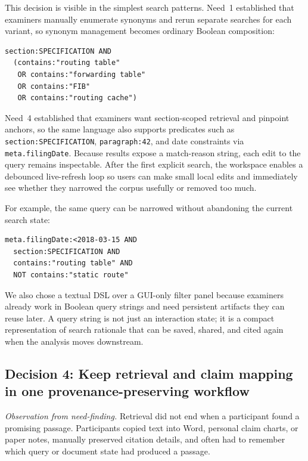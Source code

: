 \documentclass[sigconf]{acmart}
\begin{document}
This decision is visible in the simplest search patterns. Need~1 established
that examiners manually enumerate synonyms and rerun separate searches for each
variant, so synonym management becomes ordinary Boolean composition:

\begin{lstlisting}[caption={Synonym expansion across a loaded corpus.}]
section:SPECIFICATION AND
  (contains:"routing table"
   OR contains:"forwarding table"
   OR contains:"FIB"
   OR contains:"routing cache")
\end{lstlisting}

Need~4 established that examiners want section-scoped retrieval and pinpoint
anchors, so the same language also supports predicates such as
\texttt{section:SPECIFICATION}, \texttt{paragraph:42}, and date constraints via
\texttt{meta.filingDate}. Because results expose a match-reason string, each
edit to the query remains inspectable. After the first explicit search, the
workspace enables a debounced live-refresh loop so users can make small local
edits and immediately see whether they narrowed the corpus usefully or removed
too much.

For example, the same query can be narrowed without abandoning the current
search state:

\begin{lstlisting}[caption={Composing metadata, section, and exclusion filters.}]
meta.filingDate:<2018-03-15 AND
  section:SPECIFICATION AND
  contains:"routing table" AND
  NOT contains:"static route"
\end{lstlisting}

We also chose a textual DSL over a GUI-only filter panel because examiners
already work in Boolean query strings and need persistent artifacts they can
reuse later. A query string is not just an interaction state; it is a compact
representation of search rationale that can be saved, shared, and cited again
when the analysis moves downstream.


\subsection{Decision 4: Keep retrieval and claim mapping in one provenance-preserving workflow}

\emph{Observation from need-finding.} Retrieval did not end when a participant
found a promising passage. Participants copied text into Word, personal claim
charts, or paper notes, manually preserved citation details, and often had to
remember which query or document state had produced a passage.
\end{document}
